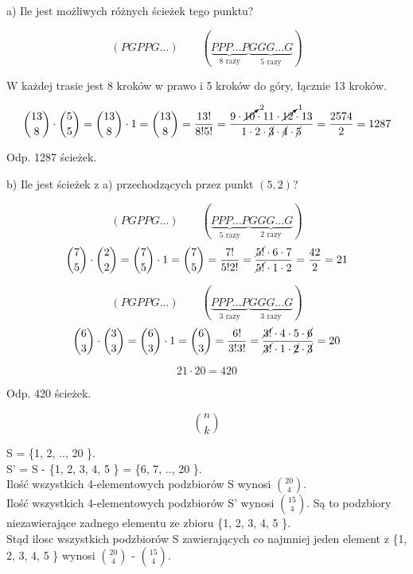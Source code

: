 \documentclass[fleqn]{article}
\begin{document}
\medskip

a) Ile jest możliwych różnych ścieżek tego punktu?

\[(PGPPG...) \qquad
(\underbrace{PPP...P}_{\displaystyle\text{8 razy}}
\underbrace{GGG...G}_{\displaystyle\text{5 razy}})\]

W każdej trasie jest 8 kroków w prawo i 5 kroków do góry, łącznie 13 kroków.

\[{13 \choose 8} \cdot {5 \choose 5}
={13 \choose 8} \cdot 1={13 \choose 8}
= \frac{13!}{8!5!}
= \frac{9 \cdot \cancelto{2}{10} \cdot 11 \cdot \cancelto{1}{12} \cdot 13}
{1 \cdot 2 \cdot \cancel{3} \cdot \cancel{4} \cdot \cancel{5}}
= \frac{2574}{2}=1287\]

Odp. 1287 ścieżek.

\vspace{1em}

b) Ile jest ścieżek z a) przechodzących przez punkt $(5, 2)$?

\[(PGPPG...) \qquad
(\underbrace{PPP...P}_{\displaystyle\text{5 razy}}
\underbrace{GGG...G}_{\displaystyle\text{2 razy}})\]
\[{7 \choose 5} \cdot {2 \choose 2}
= {7 \choose 5} \cdot 1
= {7 \choose 5}
= \frac{7!}{5!2!}
= \frac{\cancel{5!} \cdot 6 \cdot 7}{\cancel{5!} \cdot 1 \cdot 2}
= \frac{42}{2}=21\]

\[(PGPPG...) \qquad
(\underbrace{PPP...P}_{\displaystyle\text{3 razy}}\underbrace{GGG...G}_{\displaystyle\text{3 razy}})\]
\[{6 \choose 3} \cdot {3 \choose 3}
={6 \choose 3} \cdot 1
={6 \choose 3}
=\frac{6!}{3!3!}
=\frac{\cancel{3!} \cdot 4 \cdot 5 \cdot \cancel{6}}
{\cancel{3!} \cdot 1 \cdot \cancel{2} \cdot \cancel{3}}
= 20\]

\[21  \cdot  20 = 420\]

Odp. 420 ścieżek.
\medskip

\medskip
\[{n\choose k}\]
\medskip

\medskip

S = \big\{1, 2, .., 20 \big\}. \\
S' = S - \big\{1, 2, 3, 4, 5 \big\} = \big\{6, 7, .., 20 \big\}. \\
Ilość wszystkich 4-elementowych podzbiorów S wynosi ${20 \choose 4}$. \\
Ilość wszystkich 4-elementowych podzbiorów S' wynosi ${15 \choose 4}$. Są to podzbiory niezawierające zadnego elementu ze zbioru \big\{1, 2, 3, 4, 5 \big\}.\\
Stąd ilosc wszystkich podzbiorów S zawierających co najmniej jeden element z \big\{1, 2, 3, 4, 5 \big\} wynosi ${20 \choose 4}$ - ${15 \choose 4}$.\\
\end{document}

